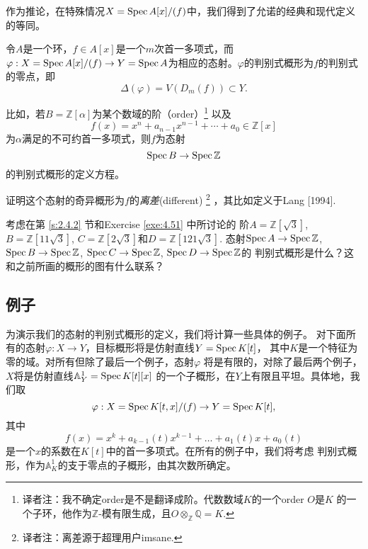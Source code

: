 作为推论，在特殊情况$X=\operatorname{Spec} A[x]/(f)$中，我们得到了允诺的经典和现代定义的等同。


\begin{coro}\label{coro:5.23}
    令$A$是一个环，$f\in A[x]$是一个$m$次首一多项式，而$\varphi:X=\operatorname{Spec} A[x]/(f)
    \to Y=\operatorname{Spec} A$为相应的态射。$\varphi$的判别式概形为$f$的判别式的零点，即
    \[
    \Delta(\varphi)=V(D_m(f)) \subset Y.\]
\end{coro}

比如，若$B=\mathbb Z[\alpha]$为某个数域的阶（order）\footnote{
    译者注：我不确定order是不是翻译成阶。代数数域$K$的一个order $O$是$K$
    的一个子环，他作为$\mathbb Z$-模有限生成，且$O\otimes_{\mathbb Z}\mathbb Q=K$.
}%
以及
\[
    f(x)=x^n+a_{n-1} x^{n-1}+\cdots+a_0 \in \mathbb{Z}[x]
\]
为$\alpha$满足的不可约首一多项式，则$f$为态射
\[
    \operatorname{Spec} B\to \operatorname{Spec} \mathbb{Z}
\]
的判别式概形的定义方程。

\begin{exa}\label{exe:5.24}
    证明这个态射的奇异概形为$f$的\textit{离差}(different)%
    \footnote{译者注：离差源于超理用户imsane. }%
    ，其比如定义于Lang [1994].
\end{exa}

\begin{exa}\label{exe:5.25}
    考虑在第 \ref{s:2.4.2} 节和Exercise \ref{exe:4.51} 中所讨论的
    阶$A=\mathbb Z[\sqrt{3}]$, $B=\mathbb Z[11\sqrt{3}]$, 
    $C=\mathbb Z[2\sqrt{3}]$和$D=\mathbb Z[121\sqrt{3}]$. 
    态射$\operatorname{Spec} A\to \operatorname{Spec} \mathbb Z$, $\operatorname{Spec} B\to \operatorname{Spec} \mathbb Z$, 
    $\operatorname{Spec} C\to \operatorname{Spec} \mathbb Z$, $\operatorname{Spec} D\to \operatorname{Spec} \mathbb Z$的
    判别式概形是什么？这和之前所画的概形的图有什么联系？
\end{exa}

\subsection{例子}

为演示我们的态射的判别式概形的定义，我们将计算一些具体的例子。
对下面所有的态射$\varphi:X\to Y$，目标概形将是仿射直线$Y=\operatorname{Spec} K[t]$，
其中$K$是一个特征为零的域。对所有但除了最后一个例子，态射$\varphi$
将是有限的，对除了最后两个例子，$X$将是仿射直线$\mathbb A_Y^1=\operatorname{Spec} K[t][x]$
的一个子概形，在$Y$上有限且平坦。具体地，我们取
\[
    \varphi: X=\operatorname{Spec} K[t, x] /(f) \rightarrow Y=\operatorname{Spec} K[t],
\]
其中
\[
    f(x)=x^k+a_{k-1}(t) x^{k-1}+\ldots+a_1(t) x+a_0(t)
\]
是一个$x$的系数在$K[t]$中的首一多项式。在所有的例子中，我们将考虑
判别式概形，作为$\mathbb A_K^1$的支于零点的子概形，由其次数所确定。

